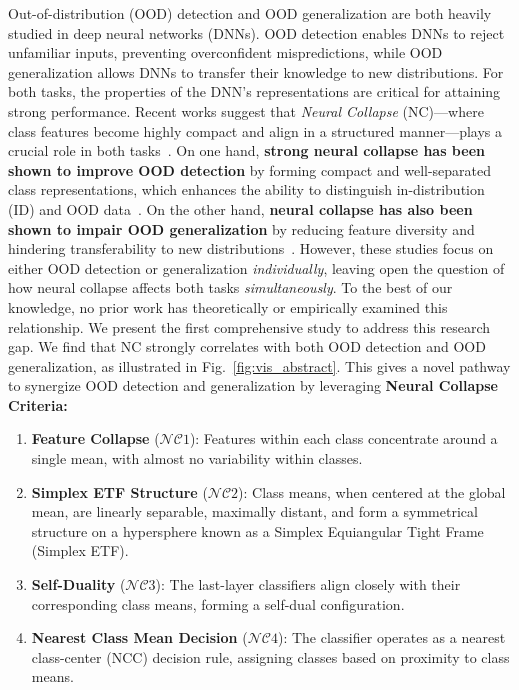 Out-of-distribution (OOD) detection and OOD generalization are both heavily studied in deep neural networks (DNNs). OOD detection enables DNNs to reject unfamiliar inputs, preventing overconfident mispredictions, while OOD generalization allows DNNs to transfer their knowledge to new distributions. 
For both tasks, the properties of the DNN's representations are critical for attaining strong performance. 
Recent works suggest that \textit{Neural Collapse} (NC)—where class features become highly compact and align in a structured manner—plays a crucial role in both tasks~\cite{papyan2020prevalence, kothapalli2023neural, zhu2021geometric, rangamani2023feature}. 
On one hand, \textbf{strong neural collapse has been shown to improve OOD detection} by forming compact and well-separated class representations, which enhances the ability to distinguish in-distribution (ID) and OOD data~\cite{haas2023linking, wu2024pursuing, ming2022poem}. 
On the other hand, \textbf{neural collapse has also been shown to impair OOD generalization} by reducing feature diversity and hindering transferability to new distributions~\cite{kothapalli2023neural, masarczyk2023tunnel, harun2024what}. 
However, these studies focus on either OOD detection or generalization \textit{individually}, leaving open the question of how neural collapse affects both tasks \textit{simultaneously}. To the best of our knowledge, no prior work has theoretically or empirically examined this relationship. We present the first comprehensive study to address this research gap. 
We find that NC strongly correlates with both OOD detection and OOD generalization, as illustrated in Fig.~\ref{fig:vis_abstract}. This gives a novel pathway to synergize OOD detection and generalization by leveraging \textbf{Neural Collapse Criteria:}
\begin{enumerate}[noitemsep, nolistsep, leftmargin=*]
    \item \textbf{Feature Collapse} ($\mathcal{NC}1$): Features within each class concentrate around a single mean, with almost no variability within classes.
    \item \textbf{Simplex ETF Structure} ($\mathcal{NC}2$): Class means, when centered at the global mean, are linearly separable, maximally distant, and form a symmetrical structure on a hypersphere known as a Simplex Equiangular Tight Frame (Simplex ETF).
    \item \textbf{Self-Duality} ($\mathcal{NC}3$): The last-layer classifiers align closely with their corresponding class means, forming a self-dual configuration.
    \item \textbf{Nearest Class Mean Decision} ($\mathcal{NC}4$): The classifier operates as a nearest class-center (NCC) decision rule, assigning classes based on proximity to class means. 
\end{enumerate}


